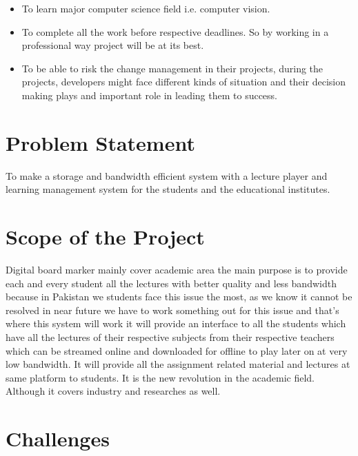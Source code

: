 \begin{itemize}

\item To learn major computer science field i.e. computer vision.


\item To complete all the work before respective deadlines. So by working in a professional way project will be at its best.

\item To be able to risk the change management in their projects, during the projects, developers might face different kinds of situation and their decision making plays and important role in leading them to success.

\end{itemize}
\bigskip

\section{Problem Statement}
To make a storage and bandwidth efficient system with a lecture player and learning management system for the students and the educational institutes.
\bigskip

\section{Scope of the Project}
Digital board marker mainly cover academic area the main purpose is to provide each and every student all the lectures with better quality and less bandwidth because in Pakistan we students face this issue the most, as we know it cannot be resolved in near future we have to work something out for this issue and that’s where this system will work it will provide an interface to all the students which have all the lectures of their respective subjects from their respective teachers which can be streamed online and downloaded for offline to play later on at very low bandwidth. It will provide all the assignment related material and lectures at same platform to students. It is the new revolution in the academic field. Although it covers industry and researches as well.
\bigskip

\section{Challenges}
\bigskip

